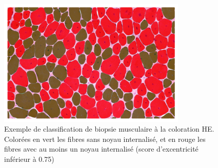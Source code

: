 \begin{figure}[htbp]
 \centering
 \includegraphics[width=0.8\textwidth]{figures/he_paint.png}
 \caption[Exemple de classification de biopsie musculaire à la coloration HE]{Exemple de classification de biopsie musculaire à la coloration HE. Colorées en vert les fibres sans noyau internalisé, et en rouge les fibres avec au moins un noyau internalisé (score d'excentricité inférieur à 0.75)}
 \label{fig:he_paint}
\end{figure}

